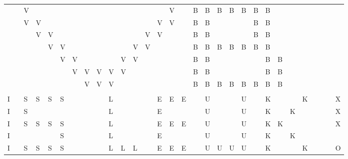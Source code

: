 \begin{tabular}{lllllllllllllllllllllllllllll}
&&V&&&&&&&&&&&&V&&B&B&B&B&B&B&B&&&&&&&\\
&&V&V&&&&&&&&&&V&V&&B&B&&&&B&B&&&&&&&\\
&&&V&V&&&&&&&&V&V&&&B&B&&&&B&B&&&&&&&\\
&&&&V&V&&&&&&V&V&&&&B&B&B&B&B&B&B&&&&&&&\\
&&&&&V&V&&&&V&V&&&&&B&B&&&&&B&B&&&&&&\\
&&&&&&V&V&V&V&V&&&&&&B&B&&&&&B&B&&&&&&\\
&&&&&&&V&V&V&&&&&&&B&B&B&B&B&B&B&B&&&&&&\\
&&&&&&&&&&&&&&&&&&&&&&&&&&&\\
I&&S&S&S&S&&&&L&&&&E&E&E&&U&&&U&&K&&&K&&&&X\\
I&&S&&&&&&&L&&&&E&&&&U&&&U&&K&&K&&&&&X\\
I&&S&S&S&S&&&&L&&&&E&E&E&&U&&&U&&K&K&&&&&&X\\
I&&&&&S&&&&L&&&&E&&&&U&&&U&&K&&K&&&&&\\
I&&S&S&S&S&&&&L&L&L&&E&E&E&&U&U&U&U&&K&&&K&&&&O\\
\end{tabular}
